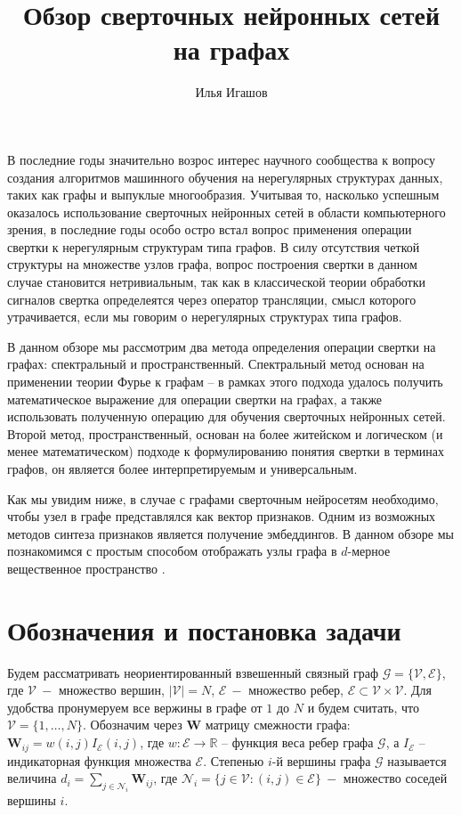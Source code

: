 \documentclass[]{article}
\title{Обзор сверточных нейронных сетей на графах}
\author{Илья Игашов}
\let\v\mathbf
\begin{document}
\maketitle

В последние годы значительно возрос интерес научного сообщества к вопросу создания алгоритмов машинного обучения на нерегулярных структурах данных, таких как графы и выпуклые многообразия. Учитывая то, насколько успешным оказалось использование сверточных нейронных сетей в области компьютерного зрения, в последние годы особо остро встал вопрос применения операции свертки к нерегулярным структурам типа графов. В силу отсутствия четкой структуры на множестве узлов графа, вопрос построения свертки в данном случае становится нетривиальным, так как в классической теории обработки сигналов свертка определеятся через оператор трансляции, смысл которого утрачивается, если мы говорим о нерегулярных структурах типа графов.

В данном обзоре мы рассмотрим два метода определения операции свертки на графах: спектральный и пространственный. Спектральный метод основан на применении теории Фурье к графам\cite{shuman2013emerging} -- в рамках этого подхода удалось получить математическое выражение для операции свертки на графах, а также использовать полученную операцию для обучения сверточных нейронных сетей. Второй метод, пространственный, основан на более житейском и логическом (и менее математическом) подходе к формулированию понятия свертки в терминах графов, он является более интерпретируемым и универсальным.

Как мы увидим ниже, в случае с графами сверточным нейросетям необходимо, чтобы узел в графе представлялся как вектор признаков. Одним из возможных методов синтеза признаков является получение эмбеддингов. В данном обзоре мы познакомимся с простым способом отображать узлы графа в $d$-мерное вещественное пространство \cite{hamilton2017representation}.

\section{Обозначения и постановка задачи}
Будем рассматривать неориентированный взвешенный связный граф $\mathcal{G}=\{\mathcal{V}, \mathcal{E}\}$, где $\mathcal{V}\ -$ множество вершин, $|\mathcal{V}|=N$, $\mathcal{E}\ -$ множество ребер, $\mathcal{E}\subset\mathcal{V}\times\mathcal{V}$. Для удобства пронумеруем все вержины в графе от $1$ до $N$ и будем считать, что $\mathcal{V}=\{1,\dots,N\}$. Обозначим через $\v{W}$ матрицу смежности графа: $\v{W}_{ij}=w(i, j)I_{\mathcal{E}}(i,j)$, где $w:\mathcal{E}\to\mathbb{R}$ -- функция веса ребер графа $\mathcal{G}$, а $I_{\mathcal{E}}$ -- индикаторная функция множества $\mathcal{E}$. Степенью $i$-й вершины графа $\mathcal{G}$ называется величина $d_i=\sum_{j\in\mathcal{N}_i}\v{W}_{ij}$, где $\mathcal{N}_i=\{j\in\mathcal{V}: (i,j)\in\mathcal{E}\}\ -$ множество соседей вершины $i$.
\end{document}
